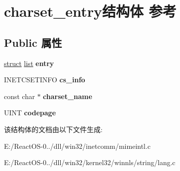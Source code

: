 \hypertarget{structcharset__entry}{}\section{charset\+\_\+entry结构体 参考}
\label{structcharset__entry}
\subsection*{Public 属性}
\begin{DoxyCompactItemize}
\item 
\mbox{\label{structcharset__entry_a5b1037380cd3524dbe47fa1adfa3622f}} 
\hyperlink{interfacestruct}{struct} \hyperlink{classlist}{list} {\bfseries entry}
\item 
\mbox{\label{structcharset__entry_abea39d478dc7020a07a3ba04088eb21d}} 
I\+N\+E\+T\+C\+S\+E\+T\+I\+N\+FO {\bfseries cs\+\_\+info}
\item 
\mbox{\label{structcharset__entry_a2b0ad4caf3451eb61c4f72ee7805dba5}} 
const char $\ast$ {\bfseries charset\+\_\+name}
\item 
\mbox{\label{structcharset__entry_ada91656d19391bbc993e88457647d1da}} 
U\+I\+NT {\bfseries codepage}
\end{DoxyCompactItemize}


该结构体的文档由以下文件生成\+:\begin{DoxyCompactItemize}
\item 
E\+:/\+React\+O\+S-\/0../dll/win32/inetcomm/mimeintl.\+c\item 
E\+:/\+React\+O\+S-\/0../dll/win32/kernel32/winnls/string/lang.\+c\end{DoxyCompactItemize}
